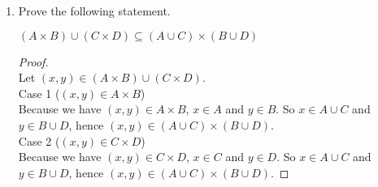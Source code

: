 \documentclass[12pt]{amsart}
\begin{document}
\begin{enumerate}[{\bfseries 1.}]
\begin{normalize}
\begin{proof}
\vspace{0.1in}
\\ (1) We will prove $(A\times B)\cap (C\times D) \subseteq (A\cap C)\times (B\cap D)$.
\\ Let $(x, y)\in (A\times B)\cap (C\times D)$, so $(x, y)\in A\times B$ and $(x, y)\in C\times D$. Then $x\in A$, $x\in C$, and $y\in B$, $y\in D$
\\ So we have $x\in A\cap C$, and $y\in B\cap D$, hence $(x, y)\in (A\cap C)\times (B\cap D)$.
\\ (2) We will prove $(A\cap C)\times (B\cap D) \subseteq (A\times B)\cap (C\times D)$.
\\ Let $(x, y)\in (A\cap C)\times (B\cap D)$, so $x\in A\cap C$, and $y\in B\cap D$. Then $x\in A$ and $x\in C$, $y\in B$ and $y\in D$. 
\\ So we have $(x, y)\in A\times B$, and $(x, y)\in C\times D$, hence $(x, y)\in (A\times B)\cap (C\times D)$.
\end{proof}
\end{normalize}
	\vfill
	\vfill
\vspace{0.2in}
\item Prove the following statement.

	\vspace{0.1in}
	\begin{center}
	\noindent
	\textit{$(A\times B)\cup (C\times D)\subseteq (A\cup C)\times (B\cup D)$}
	\end{center}

\begin{normalize}
\begin{proof}
\vspace{0.1in}
\\ Let $(x, y)\in (A\times B)\cup (C\times D)$.
\\ Case 1 ($(x, y)\in A\times B$)
\\ Because we have $(x, y)\in A\times B$, $x\in A$ and $y\in B$. So $x\in A\cup C$ and $y\in B\cup D$, hence $(x, y)\in (A\cup C)\times (B\cup D)$.
\\ Case 2 ($(x, y)\in C\times D$)
\\ Because we have $(x, y)\in C\times D$, $x\in C$ and $y\in D$. So $x\in A\cup C$ and $y\in B\cup D$, hence $(x, y)\in (A\cup C)\times (B\cup D)$.
\end{proof}
\end{normalize}
	\vfill

\end{enumerate}
\end{document}

